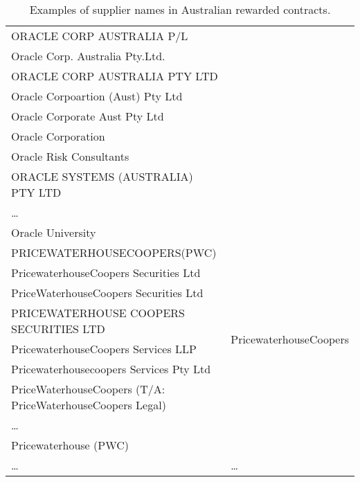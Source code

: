 \documentclass{llncs}
\begin{document}
\begin{table}[!htb]
\begin{center}
\begin{tabular}{|l|l|}
  ORACLE CORP AUSTRALIA P/L & \\
  Oracle Corp. Australia Pty.Ltd. & \\
  ORACLE CORP AUSTRALIA PTY LTD & \\
  Oracle Corpoartion (Aust) Pty Ltd & \\
  Oracle Corporate Aust Pty Ltd & \\
  Oracle Corporation & \\
  Oracle Risk Consultants & \\
  ORACLE SYSTEMS (AUSTRALIA) PTY LTD & \\
  \ldots  & \\
  Oracle University  & \\ \hline
  PRICEWATERHOUSECOOPERS(PWC)  & \multirow{8}{*}{PricewaterhouseCoopers} \\
  PricewaterhouseCoopers Securities Ltd & \\
  PriceWaterhouseCoopers Securities Ltd & \\
  PRICEWATERHOUSE COOPERS SECURITIES LTD & \\
  PricewaterhouseCoopers Services LLP & \\
  Pricewaterhousecoopers Services Pty Ltd & \\
  PriceWaterhouseCoopers (T/A: PriceWaterhouseCoopers Legal) & \\
  \ldots  & \\
  Pricewaterhouse (PWC) & \\ \hline
  \ldots & \ldots \\
  \hline
  \end{tabular}
  \caption{Examples of supplier names in Australian rewarded contracts.}
  \label{tabla:aus-suppliers}
  \end{center}
\end{table} 
\end{document}

